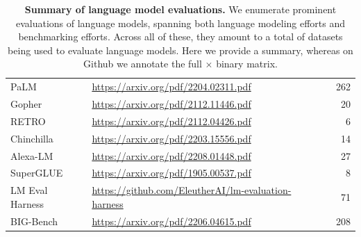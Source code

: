 \begin{table}[htp]
{\begin{tabular}{lllr}
PaLM            & \url{https://arxiv.org/pdf/2204.02311.pdf}                                                                         & \citet{chowdhery2022palm} &  262\\
Gopher          & \url{https://arxiv.org/pdf/2112.11446.pdf}                                                                         & \citet{rae2021gopher} &  20\\
RETRO           & \url{https://arxiv.org/pdf/2112.04426.pdf}                                                                         & \citet{borgeaud2022retro} &  6\\
Chinchilla      & \url{https://arxiv.org/pdf/2203.15556.pdf}                                                                         & \citet{hoffmann2022chinchilla} &  14\\
Alexa-LM        & \url{https://arxiv.org/pdf/2208.01448.pdf}                                                                         & \citet{soltan2022alexa} &  27\\
SuperGLUE       & \url{https://arxiv.org/pdf/1905.00537.pdf}                                                                         & \citet{wang2019superglue} &  8\\
LM Eval Harness & \url{https://github.com/EleutherAI/lm-evaluation-harness}                                                          & \citet{gao2021harness} &  71\\
BIG-Bench       & \url{https://arxiv.org/pdf/2206.04615.pdf}                                                                         & \citet{srivastava2022bigbench} & 208\\ 

\bottomrule
\end{tabular}}
\caption{\textbf{Summary of language model evaluations.}
We enumerate \numpriorevaluations prominent evaluations of language models, spanning both language modeling efforts and benchmarking efforts.
Across all of these, they amount to a total of \numlmdatasets datasets being used to evaluate language models.
Here we provide a summary, whereas on Github we annotate the full \numlmdatasets $\times$ \numpriorevaluations binary matrix. 
}
\label{tab:prior-evaluations}
\end{table}